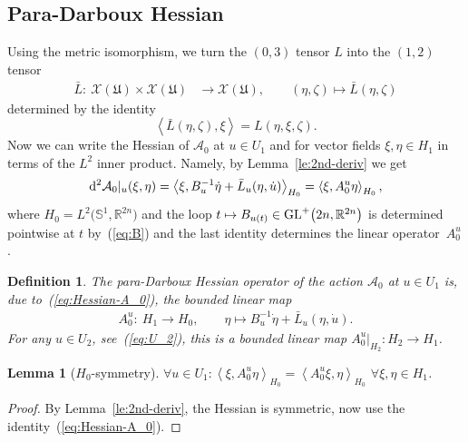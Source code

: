 \documentclass[pdftex]{sigma}
\numberwithin{equation}{section}
\newtheorem{Lemma}[Theorem]{Lemma}
\newtheorem{Definition}[Theorem]{Definition}
\newcommand{\R}{{\mathbb{R}}}
\renewcommand{\SS}{{\mathbb{S}}}
\newcommand{\Aa}{{\mathcal{A}}} %
\newcommand{\Xx}{{\mathcal{X}}}
\newcommand{\GL}{{\rm GL}}
\newcommand{\INNER}[2]{\left\langle #1, #2\right\rangle}
\newcommand{\1}{{{\mathchoice {\rm 1\mskip-4mu l} {\rm 1\mskip-4mu l}
{\rm 1\mskip-4.5mu l} {\rm 1\mskip-5mu l}}}}
\begin{document}
\subsection{Para-Darboux Hessian}

Using the metric isomorphism, we turn the $(0,3)$ tensor $L$
into the $(1,2)$ tensor
\begin{equation}\label{eq:L-(1,2)}
\begin{split}
 \bar L\colon\ \Xx(\mathfrak{U}) \times \Xx(\mathfrak{U})
 &\to \Xx(\mathfrak{U})
 ,\qquad
 (\eta,\zeta)\mapsto \bar L(\eta,\zeta)
\end{split}
\end{equation}
determined by the identity
\[
 \INNER{\bar L(\eta,\zeta)}{\xi}=L(\eta,\xi,\zeta) .
\]
Now we can write the Hessian of $\Aa_0$ at $u\in U_1$ and for
vector fields $\xi,\eta\in H_1$ in terms of the $L^2$ inner product.
Namely, by Lemma~\ref{le:2nd-deriv} we get
\begin{equation}\label{eq:Hessian-A_0}
 {\rm d}^2\Aa_0|_u (\xi,\eta )
 =\INNER{\xi}{B^{-1}_u\dot\eta +\bar L_u(\eta,\dot u)}_{H_0}
 =\INNER{\xi}{A^u_0\eta}_{H_0},
\end{equation}
where $H_0=L^2\bigl(\SS^1,\R^{2n}\bigr)$ and the loop
$t\mapsto B_{u(t)}\in\GL^+\bigl(2n,\R^{2n}\bigr)$ is
determined pointwise at $t$ by~(\ref{eq:B}) and the last identity
determines the linear operator~$A^u_0$.

\begin{Definition}%
The \textit{para-Darboux Hessian operator} of the action $\Aa_0$
at $u\in U_1$ is, due to~(\ref{eq:Hessian-A_0}), the bounded
linear map
\begin{equation}\label{eq:Hess-op-0}
\begin{split}
 A_0^u\colon\ H_1\to H_0 ,\qquad
 \eta\mapsto B_u^{-1}\dot \eta+\bar L_u(\eta,\dot u) .
\end{split}
\end{equation}
For any $u\in U_2$, see~(\ref{eq:U_2}), this is a bounded linear map
$A_0^u|_{H_2}\colon H_2\to H_1$.
\end{Definition}

\begin{Lemma}[$H_0$-symmetry]\label{le:A^u_0-symm}
$\forall u\in U_1\colon
 \INNER{\xi}{A^u_0\eta}_{H_0}=\INNER{A^u_0\xi}{\eta}_{H_0}$
$\forall \xi,\eta\in H_1$.
\end{Lemma}

\begin{proof}
By Lemma~\ref{le:2nd-deriv}, the Hessian is symmetric, now use the
identity~(\ref{eq:Hessian-A_0}).
\end{proof}
\end{document}
